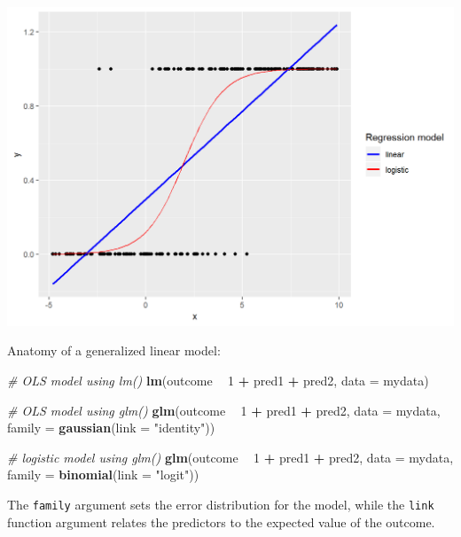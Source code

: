 \documentclass[
]{book}
\newenvironment{Shaded}{\begin{snugshade}}{\end{snugshade}}
\newcommand{\CommentTok}[1]{\textcolor[rgb]{0.56,0.35,0.01}{\textit{#1}}}
\newcommand{\DataTypeTok}[1]{\textcolor[rgb]{0.13,0.29,0.53}{#1}}
\newcommand{\DecValTok}[1]{\textcolor[rgb]{0.00,0.00,0.81}{#1}}
\newcommand{\KeywordTok}[1]{\textcolor[rgb]{0.13,0.29,0.53}{\textbf{#1}}}
\newcommand{\NormalTok}[1]{#1}
\newcommand{\OperatorTok}[1]{\textcolor[rgb]{0.81,0.36,0.00}{\textbf{#1}}}
\newcommand{\StringTok}[1]{\textcolor[rgb]{0.31,0.60,0.02}{#1}}
\begin{document}
\includegraphics{R/Rmodels/images/logistic.png}

Anatomy of a generalized linear model:

\begin{Shaded}
\begin{Highlighting}[]
  \CommentTok{# OLS model using lm()}
  \KeywordTok{lm}\NormalTok{(outcome }\OperatorTok{~}\StringTok{ }\DecValTok{1} \OperatorTok{+}\StringTok{ }\NormalTok{pred1 }\OperatorTok{+}\StringTok{ }\NormalTok{pred2, }
     \DataTypeTok{data =}\NormalTok{ mydata)}

  \CommentTok{# OLS model using glm()}
  \KeywordTok{glm}\NormalTok{(outcome }\OperatorTok{~}\StringTok{ }\DecValTok{1} \OperatorTok{+}\StringTok{ }\NormalTok{pred1 }\OperatorTok{+}\StringTok{ }\NormalTok{pred2, }
      \DataTypeTok{data =}\NormalTok{ mydata, }
      \DataTypeTok{family =} \KeywordTok{gaussian}\NormalTok{(}\DataTypeTok{link =} \StringTok{"identity"}\NormalTok{))}
 
  \CommentTok{# logistic model using glm()}
  \KeywordTok{glm}\NormalTok{(outcome }\OperatorTok{~}\StringTok{ }\DecValTok{1} \OperatorTok{+}\StringTok{ }\NormalTok{pred1 }\OperatorTok{+}\StringTok{ }\NormalTok{pred2, }
      \DataTypeTok{data =}\NormalTok{ mydata, }
      \DataTypeTok{family =} \KeywordTok{binomial}\NormalTok{(}\DataTypeTok{link =} \StringTok{"logit"}\NormalTok{))}
\end{Highlighting}
\end{Shaded}

The \texttt{family} argument sets the error distribution for the model, while the \texttt{link} function
argument relates the predictors to the expected value of the outcome.
\end{document}
